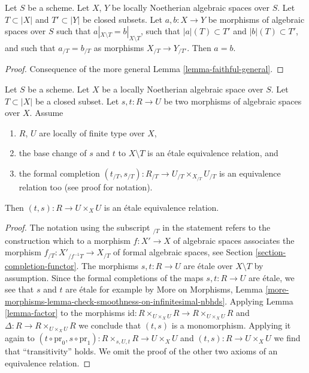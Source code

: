\begin{lemma}
\label{lemma-faithful}
Let $S$ be a scheme. Let $X$, $Y$ be locally Noetherian algebraic spaces
over $S$. Let $T \subset |X|$ and $T' \subset |Y|$ be closed subsets.
Let $a, b : X \to Y$ be morphisms of algebraic spaces over $S$ such
that $a|_{X \setminus T} = b|_{X \setminus T}$, such that
$|a|(T) \subset T'$ and $|b|(T) \subset T'$, and such that
$a_{/T} = b_{/T}$ as morphisms $X_{/T} \to Y_{/T'}$.
Then $a = b$.
\end{lemma}

\begin{proof}
Consequence of the more general Lemma \ref{lemma-faithful-general}.
\end{proof}

\begin{lemma}
\label{lemma-equivalence-relation}
Let $S$ be a scheme. Let $X$ be a locally Noetherian algebraic space
over $S$. Let $T \subset |X|$ be a closed subset.
Let $s, t : R \to U$ be two morphisms of algebraic spaces over $X$.
Assume
\begin{enumerate}
\item $R$, $U$ are locally of finite type over $X$,
\item the base change of $s$ and $t$ to $X \setminus T$
is an \'etale equivalence relation, and
\item the formal completion
$(t_{/T}, s_{/T}) : R_{/T} \to U_{/T} \times_{X_{/T}} U_{/T}$
is an equivalence relation too (see proof for notation).
\end{enumerate}
Then $(t, s) : R \to U \times_X U$ is an \'etale equivalence relation.
\end{lemma}

\begin{proof}
The notation using the subscript ${}_{/T}$ in the statement refers to the
construction which to a morphism $f : X' \to X$ of algebraic spaces
associates the morphism $f_{/T} : X'_{/f^{-1}T} \to X_{/T}$ of formal
algebraic spaces, see Section \ref{section-completion-functor}.
The morphisms $s, t : R \to U$ are \'etale over $X \setminus T$
by assumption. Since the formal completions of the maps
$s, t : R \to U$ are \'etale, we see that $s$ and $t$ are \'etale
for example by More on Morphisms, Lemma
\ref{more-morphisms-lemma-check-smoothness-on-infinitesimal-nbhds}.
Applying Lemma \ref{lemma-factor} to the morphisms
$\text{id} : R \times_{U \times_X U} R \to R \times_{U \times_X U} R$
and $\Delta : R \to R \times_{U \times_X U} R$ we conclude that
$(t, s)$ is a monomorphism. Applying it again to
$(t \circ \text{pr}_0, s \circ \text{pr}_1) :
R \times_{s, U, t} R \to U \times_X U$ and $(t, s) : R \to U \times_X U$
we find that ``transitivity'' holds. We omit the proof of
the other two axioms of an equivalence relation.
\end{proof}

